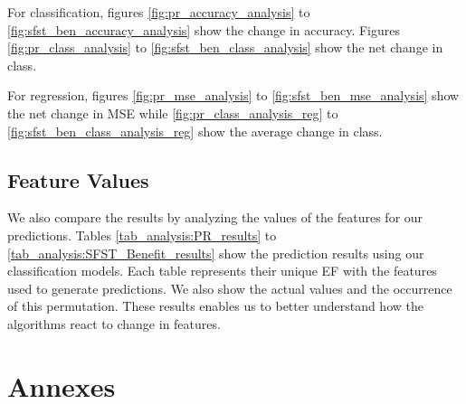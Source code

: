 \documentclass[12pt,letterpaper]{article}
\begin{document}
For classification, figures \ref{fig:pr_accuracy_analysis} to \ref{fig:sfst_ben_accuracy_analysis} show the change in accuracy.
Figures \ref{fig:pr_class_analysis} to \ref{fig:sfst_ben_class_analysis} show the net change in class.


For regression, figures \ref{fig:pr_mse_analysis} to \ref{fig:sfst_ben_mse_analysis} show the net change in MSE while \ref{fig:pr_class_analysis_reg} to 
\ref{fig:sfst_ben_class_analysis_reg} show the average change in class.



\clearpage

\subsection{Feature Values}
We also compare the results by analyzing the values of the features for our predictions.
Tables \ref{tab_analysis:PR_results} to \ref{tab_analysis:SFST_Benefit_results} show the prediction results using our classification models.
Each table represents their unique \ac{EF} with the features used to generate predictions.
We also show the actual values and the occurrence of this permutation.
These results enables us to better understand how the algorithms react to change in features.






\clearpage
\section{Annexes}
\end{document}
